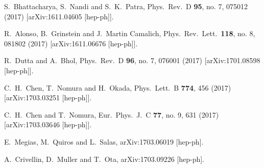 \documentclass[prd,preprint,superscriptaddress,amsmath,amssymb]{revtex4}
\begin{document}
\begin{thebibliography}{100}
 S.~Bhattacharya, S.~Nandi and S.~K.~Patra,
 Phys.\ Rev.\ D {\bf 95}, no. 7, 075012 (2017)
 [arXiv:1611.04605 [hep-ph]].
  
  R.~Alonso, B.~Grinstein and J.~Martin Camalich,
  Phys.\ Rev.\ Lett.\  {\bf 118}, no. 8, 081802 (2017)
  [arXiv:1611.06676 [hep-ph]].

  R.~Dutta and A.~Bhol,
  Phys.\ Rev.\ D {\bf 96}, no. 7, 076001 (2017)
  [arXiv:1701.08598 [hep-ph]].

  C.~H.~Chen, T.~Nomura and H.~Okada,
  Phys.\ Lett.\ B {\bf 774}, 456 (2017)
  [arXiv:1703.03251 [hep-ph]].
  
    
  C.~H.~Chen and T.~Nomura,
  Eur.\ Phys.\ J.\ C {\bf 77}, no. 9, 631 (2017)
  [arXiv:1703.03646 [hep-ph]].
  
  E.~Megias, M.~Quiros and L.~Salas,
  arXiv:1703.06019 [hep-ph].
  
 
  
  A.~Crivellin, D.~Muller and T.~Ota,
  arXiv:1703.09226 [hep-ph].


\end{thebibliography}
\end{document}
